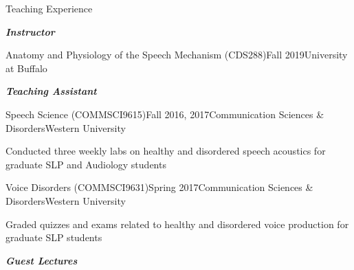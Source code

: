 \documentclass{resume} %
\begin{document}



\begin{rSection}{Teaching Experience}

\begin{center}
	{\bf \emph{Instructor}}
\end{center}

	\begin{rSubsection}{Anatomy and Physiology of the Speech Mechanism (CDS288)}{Fall 2019}{University at Buffalo}{}
	\end{rSubsection}

\begin{center}
	{\bf \emph{Teaching Assistant}}
\end{center}
	
	\begin{rSubsection}{Speech Science (COMMSCI9615)}{Fall 2016, 2017}{Communication Sciences \& Disorders}{Western University}
	\item Conducted three weekly labs on healthy and disordered speech acoustics for graduate SLP and Audiology students
	\end{rSubsection}

	\begin{rSubsection}{Voice Disorders (COMMSCI9631)}{Spring 2017}{Communication Sciences \& Disorders}{Western University}
	\item Graded quizzes and exams related to healthy and disordered voice production for graduate SLP students
	\end{rSubsection}
	
	
\begin{center}
	{\bf \emph{Guest Lectures}}
\end{center}


\end{rSection}
\end{document}

